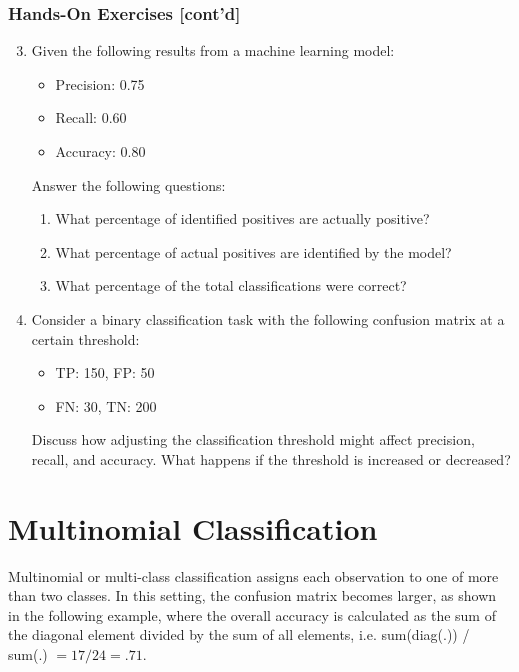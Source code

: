 \begin{tcolorbox}[colback=code]
\subsubsection*{Hands-On Exercises [cont'd]} 

\begin{enumerate}
  \setcounter{enumi}{2}
  \item Given the following results from a machine learning model:
  \begin{itemize}
    \item Precision: 0.75
    \item Recall: 0.60
    \item Accuracy: 0.80
  \end{itemize}
  Answer the following questions:
  \begin{enumerate}
    \item What percentage of identified positives are actually positive?
    \item What percentage of actual positives are identified by the model?
    \item What percentage of the total classifications were correct?
  \end{enumerate}

  \vspace{.5\baselineskip}
  \item Consider a binary classification task with the following confusion matrix at a certain threshold:
  \begin{itemize}
    \item TP: 150, FP: 50
    \item FN: 30, TN: 200
  \end{itemize}
  Discuss how adjusting the classification threshold might affect precision, recall, and accuracy. What happens if the threshold is increased or decreased?
\end{enumerate}
\end{tcolorbox}

\section{Multinomial Classification}

Multinomial or multi-class classification assigns each observation to one of more than two classes. In this setting, the confusion matrix becomes larger, as shown in the following example, where the overall accuracy is calculated as the sum of the diagonal element divided by the sum of all elements, i.e. sum(diag(.)) / sum(.) $=17/24=.71$.

